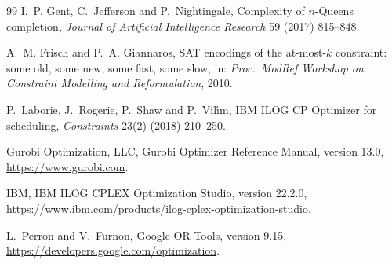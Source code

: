 \documentclass[a4paper,fleqn]{cas-sc}
\begin{document}
\begin{thebibliography}{99}
I.~P. Gent, C.~Jefferson and P.~Nightingale, Complexity of $n$-Queens completion, \emph{Journal of Artificial Intelligence Research} 59 (2017) 815--848.

A.~M. Frisch and P.~A. Giannaros, SAT encodings of the at-most-$k$ constraint: some old, some new, some fast, some slow, in: \emph{Proc.\ ModRef Workshop on Constraint Modelling and Reformulation}, 2010.

P.~Laborie, J.~Rogerie, P.~Shaw and P.~Vil\'{\i}m, IBM ILOG CP Optimizer for scheduling, \emph{Constraints} 23(2) (2018) 210--250.

Gurobi Optimization, LLC, Gurobi Optimizer Reference Manual, version 13.0, \url{https://www.gurobi.com}.

IBM, IBM ILOG CPLEX Optimization Studio, version 22.2.0, \url{https://www.ibm.com/products/ilog-cplex-optimization-studio}.

L.~Perron and V.~Furnon, Google OR-Tools, version 9.15, \url{https://developers.google.com/optimization}.
\end{thebibliography}

\clearpage %
\end{document}
